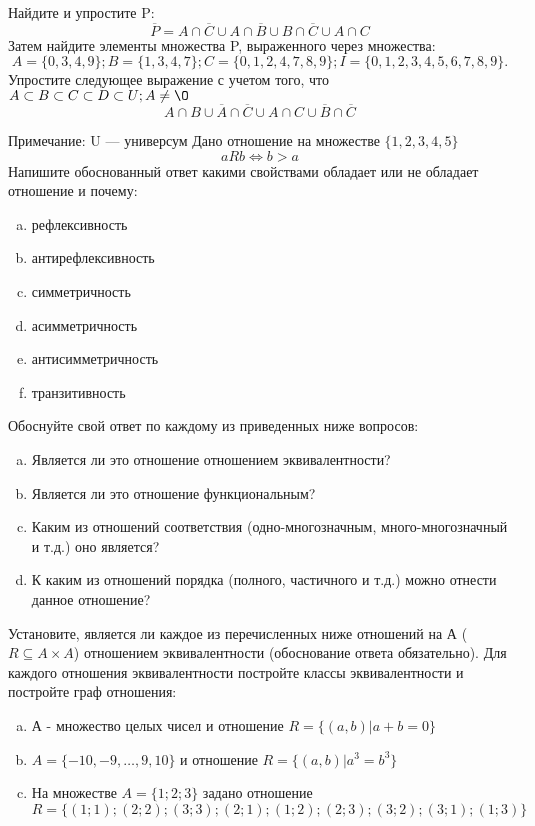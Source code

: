 \documentclass[10pt]{exam}
\begin{document}
\begin{questions}
\question
Найдите и упростите P:
\begin{equation*}
\overline{P} = A \cap \overline{C} \cup A \cap \overline{B} \cup B \cap \overline{C} \cup A \cap C
\end{equation*}
Затем найдите элементы множества P, выраженного через множества:
\begin{equation*}
A = \{0, 3, 4, 9\}; 
B = \{1, 3, 4, 7\};
C = \{0, 1, 2, 4, 7, 8, 9\};
I = \{0, 1, 2, 3, 4, 5, 6, 7, 8, 9\}.
\end{equation*}\question
Упростите следующее выражение с учетом того, что $A\subset B \subset C \subset D \subset U; A \neq \O$
\begin{equation*}
A \cap B \cup \overline{A} \cap \overline{C} \cup A \cap C \cup \overline{B} \cap \overline{C}
\end{equation*}

Примечание: U — универсум\question
Дано отношение на множестве $\{1, 2, 3, 4, 5\}$ 
\begin{equation*}
aRb \iff b > a
\end{equation*}
Напишите обоснованный ответ какими свойствами обладает или не обладает отношение и почему:   
\begin{enumerate} [a)]\setcounter{enumi}{0}
\item рефлексивность
\item антирефлексивность
\item симметричность
\item асимметричность
\item антисимметричность
\item транзитивность
\end{enumerate}

Обоснуйте свой ответ по каждому из приведенных ниже вопросов:
\begin{enumerate} [a)]\setcounter{enumi}{0}
    \item Является ли это отношение отношением эквивалентности?
    \item Является ли это отношение функциональным?
    \item Каким из отношений соответствия (одно-многозначным, много-многозначный и т.д.) оно является?
    \item К каким из отношений порядка (полного, частичного и т.д.) можно отнести данное отношение?
\end{enumerate}

\question
Установите, является ли каждое из перечисленных ниже отношений на А ($R \subseteq A \times A$) отношением эквивалентности (обоснование ответа обязательно). Для каждого отношения эквивалентности 
постройте классы эквивалентности и постройте граф отношения:
\begin{enumerate}[a)]\setcounter{enumi}{0}
\item А - множество целых чисел и отношение $R = \{(a,b)|a + b = 0\}$
\item $A = \{-10, -9, …, 9, 10\}$ и отношение $R = \{(a,b)|a^{3} = b^{3}\}$
\item На множестве $A = \{1; 2; 3\}$ задано отношение $R = \{(1; 1); (2; 2); (3; 3); (2; 1); (1; 2); (2; 3); (3; 2); (3; 1); (1; 3)\}$


\end{enumerate}
\end{questions}
\end{document}
